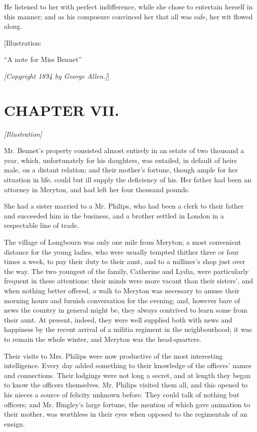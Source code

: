 \documentclass[12pt]{book}
\begin{document}
He listened to her with perfect indifference, while she chose to entertain herself in this manner; and as his composure convinced her that all was safe, her wit flowed along.

[Illustration:

``A note for Miss Bennet''

\emph{[\textit{Copyright 1894 by George Allen.}]}]

\chapter{CHAPTER VII.}

\emph{[Illustration]}

Mr. Bennet's property consisted almost entirely in an estate of two thousand a year, which, unfortunately for his daughters, was entailed, in default of heirs male, on a distant relation; and their mother's fortune, though ample for her situation in life, could but ill supply the deficiency of his. Her father had been an attorney in Meryton, and had left her four thousand pounds.

She had a sister married to a Mr. Philips, who had been a clerk to their father and succeeded him in the business, and a brother settled in London in a respectable line of trade.

The village of Longbourn was only one mile from Meryton; a most convenient distance for the young ladies, who were usually tempted thither three or four times a week, to pay their duty to their aunt, and to a milliner's shop just over the way. The two youngest of the family, Catherine and Lydia, were particularly frequent in these attentions: their minds were more vacant than their sisters', and when nothing better offered, a walk to Meryton was necessary to amuse their morning hours and furnish conversation for the evening; and, however bare of news the country in general might be, they always contrived to learn some from their aunt. At present, indeed, they were well supplied both with news and happiness by the recent arrival of a militia regiment in the neighbourhood; it was to remain the whole winter, and Meryton was the head-quarters.

Their visits to Mrs. Philips were now productive of the most interesting intelligence. Every day added something to their knowledge of the officers' names and connections. Their lodgings were not long a secret, and at length they began to know the officers themselves. Mr. Philips visited them all, and this opened to his nieces a source of felicity unknown before. They could talk of nothing but officers; and Mr. Bingley's large fortune, the mention of which gave animation to their mother, was worthless in their eyes when opposed to the regimentals of an ensign.
\end{document}
